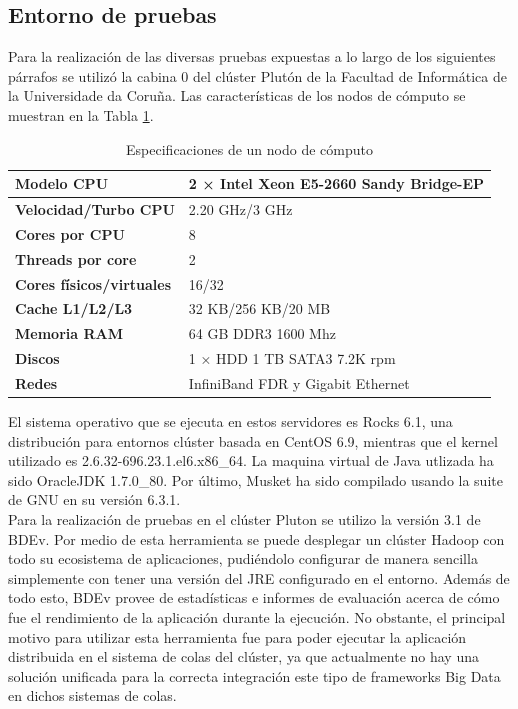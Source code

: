 \documentclass[conference]{IEEEtran}
\begin{document}
\subsection{Entorno de pruebas}
Para la realización de las diversas pruebas expuestas a lo largo de los siguientes párrafos se utilizó la cabina 0 del clúster Plutón\cite{pluton} de la Facultad de Informática de la Universidade da Coruña. Las características de los nodos de cómputo se muestran en la Tabla \ref{node_especification}.\\ 

\begin{table}[t]
	\begin{center}
		\caption{Especificaciones de un nodo de cómputo}
		\begin{tabular}{|l|l|}
			\hline
			\textbf{Modelo CPU} & 2 × Intel Xeon E5-2660 Sandy Bridge-EP \\ \hline
			\textbf{Velocidad/Turbo CPU} & 2.20 GHz/3 GHz \\ \hline
			\textbf{Cores por CPU} & 8 \\ \hline
			\textbf{Threads por core} & 2 \\ \hline
			\textbf{Cores físicos/virtuales} & 16/32 \\ \hline
			\textbf{Cache L1/L2/L3} & 32 KB/256 KB/20 MB \\ \hline
			\textbf{Memoria RAM} & 64 GB DDR3 1600 Mhz \\ \hline
			\textbf{Discos} & 1 × HDD 1 TB SATA3 7.2K rpm\\ \hline
			\textbf{Redes} & InfiniBand FDR y Gigabit Ethernet \\ \hline
		\end{tabular}
		\label{node_especification}
	\end{center}
\end{table}

El sistema operativo que se ejecuta en estos servidores es Rocks 6.1, una distribución para entornos clúster basada en CentOS 6.9, mientras que el kernel utilizado es 2.6.32-696.23.1.el6.x86\_64. La maquina virtual de Java utlizada ha sido OracleJDK 1.7.0\_80. Por último, Musket ha sido compilado usando la suite de GNU en su versión 6.3.1.\\

Para la realización de pruebas en el clúster Pluton se utilizo la versión 3.1 de BDEv\cite{bdev}. Por medio de esta herramienta se puede desplegar un clúster Hadoop con todo su ecosistema de aplicaciones, pudiéndolo configurar de manera sencilla simplemente con tener una versión del JRE configurado en el entorno. Además de todo esto, BDEv provee de estadísticas e informes de evaluación acerca de cómo fue el rendimiento de la aplicación durante la ejecución. No obstante, el principal motivo para utilizar esta herramienta fue para poder ejecutar la aplicación distribuida en el sistema de colas del clúster, ya que actualmente no hay una solución unificada para la correcta integración este tipo de frameworks Big Data en dichos sistemas de colas.\\
\end{document}
